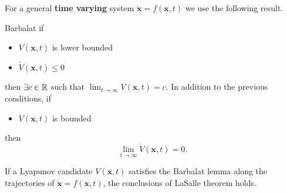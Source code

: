 \documentclass[10pt, a4paper]{report}
\begin{document}
\noindent For a general \textbf{time varying} system $\dot {\mathbf x}=f(\mathbf x,t)$ we use the following result.\begin{boxlemma}{Barbalat}{}
    if\begin{itemize}
        \item $V(\mathbf x,t)$ is lower bounded 
        \item $\dot V(\mathbf x,t)\le 0$
    \end{itemize}
    then $\exists c\in {\mathbb R}$ such that $\displaystyle\lim_{t\rightarrow \infty} V(\mathbf x,t)=c$. In addition to the previous conditions, if\begin{itemize}
        \item $\ddot V(\mathbf x,t)$ is bounded
    \end{itemize}
    then
    \begin{equation}
        \lim_{t\rightarrow \infty}\dot V(\mathbf x,t)=0.
    \end{equation}
\end{boxlemma}
If a Lyapunov candidate $V(\mathbf x,t)$ satisfies the Barbalat lemma along the trajectories of $\dot {\mathbf x}=f(\mathbf x,t)$, the conclusions of LaSalle theorem holds. 
\end{document}
